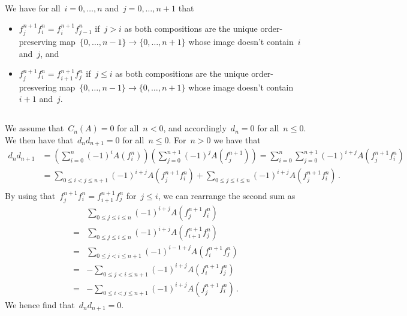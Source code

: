 \section{}

We have for all~$i = 0, \dotsc, n$ and~$j = 0, \dotsc, n+1$ that
\begin{itemize}
  \item
    $f^{n+1}_j f^n_i = f^{n+1}_i f^n_{j-1}$ if~$j > i$ as both compositions are the unique order-preserving map~$\{0, \dotsc, n-1\} \to \{0, \dotsc, n+1\}$ whose image doesn’t contain~$i$ and~$j$, and
  \item
    $f^{n+1}_j f^n_i = f^{n+1}_{i+1} f^n_j$ if~$j \leq i$ as both compositions are the unique order-presvering map~$\{0, \dotsc, n-1\} \to \{0, \dotsc, n+1\}$ whose image doesn’t contain~$i+1$ and~$j$.
\end{itemize}





\subsection{}

We assume that~$C_n(A) = 0$ for all~$n < 0$, and accordingly~$d_n = 0$ for all~$n \leq 0$.
We then have that~$d_n d_{n+1} = 0$ for all~$n \leq 0$.
For~$n > 0$ we have that
\begin{align*}
      d_n d_{n+1}
  &=  \left( \sum_{i=0}^n (-1)^i A(f^n_i) \right)
      \left( \sum_{j=0}^{n+1} (-1)^j A(f^{n+1}_j) \right)
   =  \sum_{i=0}^n \sum_{j=0}^{n+1} (-1)^{i+j} A(f^{n+1}_j f^n_i) \\
  &=    \sum_{0 \leq i < j \leq n+1} (-1)^{i+j} A(f^{n+1}_j f^n_i)
      + \sum_{0 \leq j \leq i \leq n} (-1)^{i+j} A(f^{n+1}_j f^n_i) \,. \\
\end{align*}
By using that~$f^{n+1}_j f^n_i = f^{n+1}_{i+1} f^n_j$ for~$j \leq i$, we can rearrange the second sum as
\begin{align*}
   {}&  \sum_{0 \leq j \leq i \leq n} (-1)^{i+j} A(f^{n+1}_j f^n_i) \\
  ={}&  \sum_{0 \leq j \leq i \leq n} (-1)^{i+j} A(f^{n+1}_{i+1} f^n_j) \\
  ={}&  \sum_{0 \leq j < i \leq n+1} (-1)^{i-1+j} A(f^{n+1}_i f^n_j) \\
  ={}&  -\sum_{0 \leq j < i \leq n+1} (-1)^{i+j} A(f^{n+1}_i f^n_j)  \\
  ={}&  -\sum_{0 \leq i < j \leq n+1} (-1)^{i+j} A(f^{n+1}_j f^n_i) \,.
\end{align*}
We hence find that~$d_n d_{n+1} = 0$.





